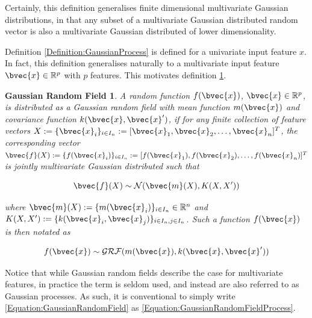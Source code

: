 			Certainly, this definition generalises finite dimensional multivariate Gaussian distributions, in that any subset of a multivariate Gaussian distributed random vector is also a multivariate Gaussian distributed of lower dimensionality.

			Definition \ref{Definition:GaussianProcess} is defined for a univariate input feature $x$. In fact, this definition generalises naturally to a multivariate input feature $\bvec{x} \in \mathbb{R}^{p}$ with $p$ features. This motivates definition \ref{Definition:GaussianRandomField}.
			
			\newtheorem{grfdef}{Gaussian Random Field}[section]
			\begin{grfdef}
				A random function $f(\bvec{x})$, $\bvec{x} \in \mathbb{R}^{p}$, is distributed as a Gaussian random field with mean function $m(\bvec{x})$ and covariance function $k(\bvec{x}, \bvec{x}')$, if for any finite collection of feature vectors $X := \{\bvec{x}_{i}\}_{i \in I_{n}} := [\bvec{x}_{1}, \bvec{x}_{2}, \dots, \bvec{x}_{n}]^{T}$, the corresponding vector $\bvec{f}(X) := \{f(\bvec{x}_{i})\}_{i \in I_{n}} := [f(\bvec{x}_{1}), f(\bvec{x}_{2}), \dots, f(\bvec{x}_{n})]^{T}$ is jointly multivariate Gaussian distributed such that 

					\begin{equation}
						\bvec{f}(X) \sim \mathcal{N}(\bvec{m}(X), K(X, X'))
					\label{Equation:GaussianRandomFieldFiniteDistribution}
					\end{equation}	
				
				where $\bvec{m}(X) :=  \{m(\bvec{x}_{i})\}_{i \in I_{n}} \in \mathbb{R}^{n}$ and $K(X, X') := \{k(\bvec{x}_{i}, \bvec{x}_{j})\}_{i \in I_{n}, j \in I_{n}}$. Such a function $f(\bvec{x})$ is then notated as
				
					\begin{equation}
						f(\bvec{x}) \sim \mathcal{GRF}(m(\bvec{x}), k(\bvec{x}, \bvec{x}'))
					\label{Equation:GaussianRandomField}
					\end{equation}	
					
			\label{Definition:GaussianRandomField}
			\end{grfdef}
			
			Notice that while Gaussian random fields describe the case for multivariate features, in practice the term is seldom used, and instead are also referred to as Gaussian processes. As such, it is conventional to simply write \eqref{Equation:GaussianRandomField} as \eqref{Equation:GaussianRandomFieldProcess}.
	
